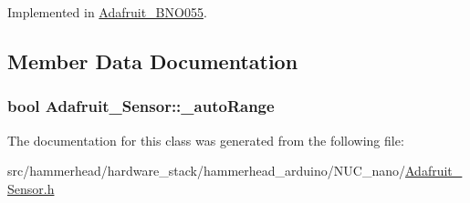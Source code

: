 Implemented in \hyperlink{classAdafruit__BNO055_a1a0849285f6cebde09b4812d9683010c}{Adafruit\+\_\+\+B\+N\+O055}.



\subsection{Member Data Documentation}
\subsubsection[{\texorpdfstring{\+\_\+auto\+Range}{_autoRange}}]{\setlength{\rightskip}{0pt plus 5cm}bool Adafruit\+\_\+\+Sensor\+::\+\_\+auto\+Range\hspace{0.3cm}{\ttfamily [private]}}\hypertarget{classAdafruit__Sensor_a79419e4b6898903c0de4aa80133f01ae}{}\label{classAdafruit__Sensor_a79419e4b6898903c0de4aa80133f01ae}


The documentation for this class was generated from the following file\+:\begin{DoxyCompactItemize}
\item 
src/hammerhead/hardware\+\_\+stack/hammerhead\+\_\+arduino/\+N\+U\+C\+\_\+nano/\hyperlink{Adafruit__Sensor_8h}{Adafruit\+\_\+\+Sensor.\+h}\end{DoxyCompactItemize}

